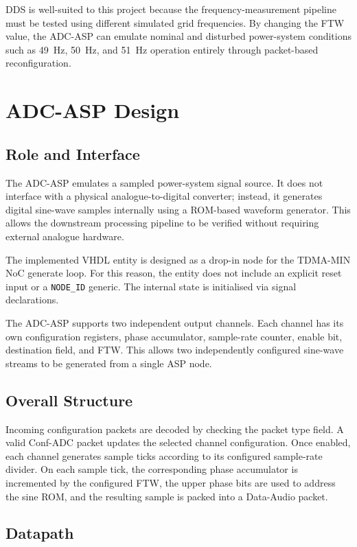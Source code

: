 \documentclass[10pt, a4paper]{article}
\begin{document}
DDS is well-suited to this project because the frequency-measurement pipeline must be tested using different simulated grid frequencies. By changing the FTW value, the ADC-ASP can emulate nominal and disturbed power-system conditions such as 49~Hz, 50~Hz, and 51~Hz operation entirely through packet-based reconfiguration.

\section{ADC-ASP Design}
\label{sec:adc_asp_design}

\subsection{Role and Interface}

The ADC-ASP emulates a sampled power-system signal source. It does not interface with a physical analogue-to-digital converter; instead, it generates digital sine-wave samples internally using a ROM-based waveform generator. This allows the downstream processing pipeline to be verified without requiring external analogue hardware.

The implemented VHDL entity is designed as a drop-in node for the TDMA-MIN NoC generate loop. For this reason, the entity does not include an explicit reset input or a \texttt{NODE\_ID} generic. The internal state is initialised via signal declarations.

The ADC-ASP supports two independent output channels. Each channel has its own configuration registers, phase accumulator, sample-rate counter, enable bit, destination field, and FTW. This allows two independently configured sine-wave streams to be generated from a single ASP node.

\subsection{Overall Structure}

Incoming configuration packets are decoded by checking the packet type field. A valid Conf-ADC packet updates the selected channel configuration. Once enabled, each channel generates sample ticks according to its configured sample-rate divider. On each sample tick, the corresponding phase accumulator is incremented by the configured FTW, the upper phase bits are used to address the sine ROM, and the resulting sample is packed into a Data-Audio packet.

\subsection{Datapath}
\end{document}
